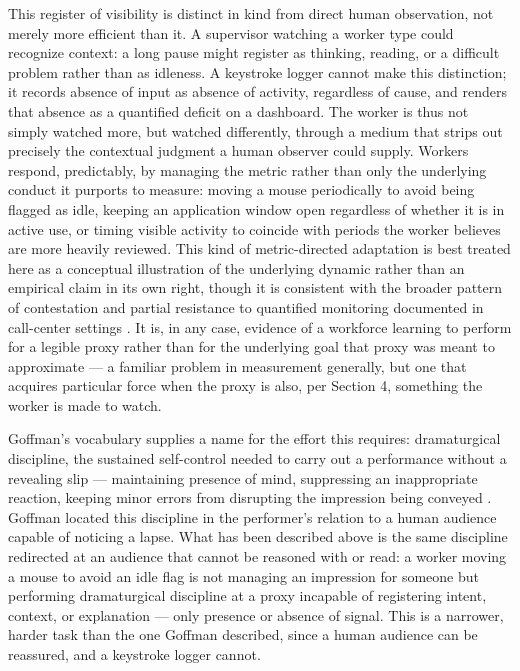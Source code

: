 \documentclass[10pt]{article}
\begin{document}
This register of visibility is distinct in kind from direct human observation, not merely more efficient than it. A supervisor watching a worker type could recognize context: a long pause might register as thinking, reading, or a difficult problem rather than as idleness. A keystroke logger cannot make this distinction; it records absence of input as absence of activity, regardless of cause, and renders that absence as a quantified deficit on a dashboard. The worker is thus not simply watched more, but watched differently, through a medium that strips out precisely the contextual judgment a human observer could supply. Workers respond, predictably, by managing the metric rather than only the underlying conduct it purports to measure: moving a mouse periodically to avoid being flagged as idle, keeping an application window open regardless of whether it is in active use, or timing visible activity to coincide with periods the worker believes are more heavily reviewed. This kind of metric-directed adaptation is best treated here as a conceptual illustration of the underlying dynamic rather than an empirical claim in its own right, though it is consistent with the broader pattern of contestation and partial resistance to quantified monitoring documented in call-center settings \cite{bain2000}. It is, in any case, evidence of a workforce learning to perform for a legible proxy rather than for the underlying goal that proxy was meant to approximate --- a familiar problem in measurement generally, but one that acquires particular force when the proxy is also, per Section 4, something the worker is made to watch.

Goffman's vocabulary supplies a name for the effort this requires: dramaturgical discipline, the sustained self-control needed to carry out a performance without a revealing slip --- maintaining presence of mind, suppressing an inappropriate reaction, keeping minor errors from disrupting the impression being conveyed \cite{goffman}. Goffman located this discipline in the performer's relation to a human audience capable of noticing a lapse. What has been described above is the same discipline redirected at an audience that cannot be reasoned with or read: a worker moving a mouse to avoid an idle flag is not managing an impression for someone but performing dramaturgical discipline at a proxy incapable of registering intent, context, or explanation --- only presence or absence of signal. This is a narrower, harder task than the one Goffman described, since a human audience can be reassured, and a keystroke logger cannot.
\end{document}
